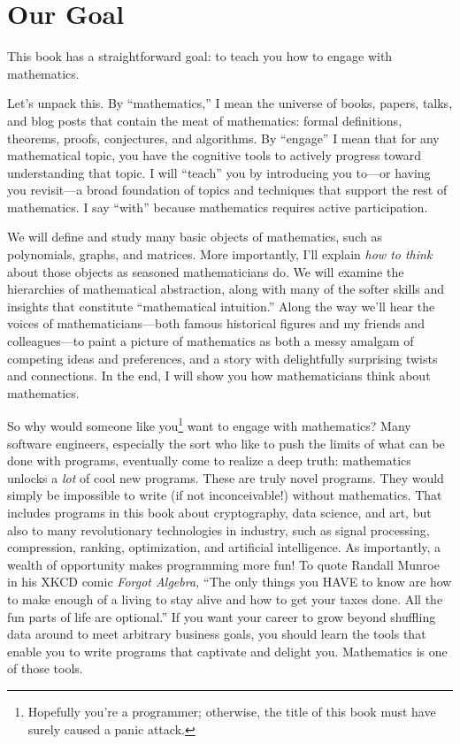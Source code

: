 
\frontmatter

\chapter{Our Goal}

This book has a straightforward goal: to teach you how to engage with
mathematics.

Let's unpack this. By ``mathematics,'' I mean the universe of books, papers,
talks, and blog posts that contain the meat of mathematics: formal definitions,
theorems, proofs, conjectures, and algorithms. By ``engage'' I mean that for
any mathematical topic, you have the cognitive tools to actively progress
toward understanding that topic. I will ``teach'' you by introducing you
to---or having you revisit---a broad foundation of topics and techniques that
support the rest of mathematics. I say ``with'' because mathematics requires
active participation.

We will define and study many basic objects of mathematics, such as
polynomials, graphs, and matrices. More importantly, I'll explain \emph{how to
think} about those objects as seasoned mathematicians do. We will examine the
hierarchies of mathematical abstraction, along with many of the softer skills
and insights that constitute ``mathematical intuition.'' Along the way we'll
hear the voices of mathematicians---both famous historical figures and my
friends and colleagues---to paint a picture of mathematics as both a messy
amalgam of competing ideas and preferences, and a story with delightfully
surprising twists and connections.  In the end, I will show you how
mathematicians think about mathematics.

So why would someone like you\footnote{Hopefully you're a programmer;
otherwise, the title of this book must have surely caused a panic attack.} want
to engage with mathematics? Many software engineers, especially the sort who
like to push the limits of what can be done with programs, eventually come to
realize a deep truth: mathematics unlocks a \emph{lot} of cool new programs.
These are truly novel programs. They would simply be impossible to write (if
not inconceivable!) without mathematics. That includes programs in this book
about cryptography, data science, and art, but also to many revolutionary
technologies in industry, such as signal processing, compression, ranking,
optimization, and artificial intelligence. As importantly, a wealth of
opportunity makes programming more fun! To quote Randall Munroe in his XKCD
comic \emph{Forgot Algebra,} ``The only things you HAVE to know are how to make
enough of a living to stay alive and how to get your taxes done. All the fun
parts of life are optional.'' If you want your career to grow beyond shuffling
data around to meet arbitrary business goals, you should learn the tools that
enable you to write programs that captivate and delight you. Mathematics is one
of those tools.

